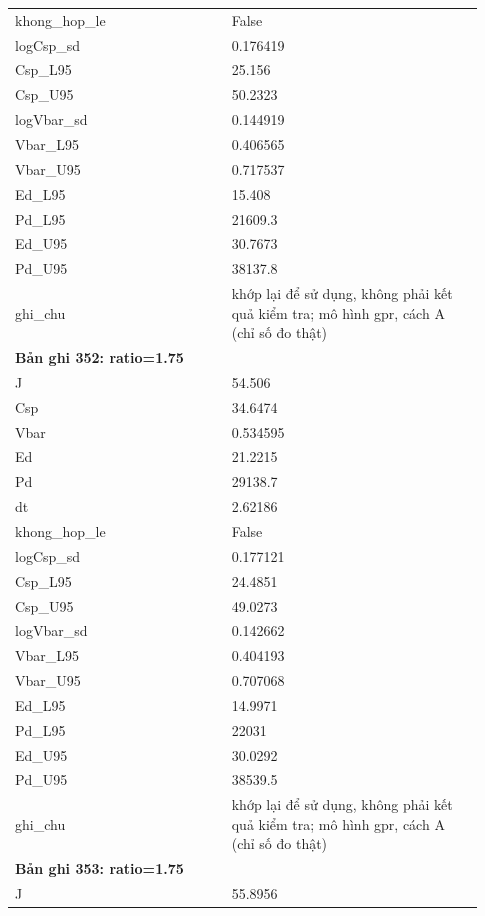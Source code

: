 \begin{longtable}{p{0.43\linewidth}p{0.50\linewidth}}
khong\_\allowbreak hop\_\allowbreak le & False \\
logCsp\_\allowbreak sd & 0.176419 \\
Csp\_\allowbreak L95 & 25.156 \\
Csp\_\allowbreak U95 & 50.2323 \\
logVbar\_\allowbreak sd & 0.144919 \\
Vbar\_\allowbreak L95 & 0.406565 \\
Vbar\_\allowbreak U95 & 0.717537 \\
Ed\_\allowbreak L95 & 15.408 \\
Pd\_\allowbreak L95 & 21609.3 \\
Ed\_\allowbreak U95 & 30.7673 \\
Pd\_\allowbreak U95 & 38137.8 \\
ghi\_\allowbreak chu & khớp lại để sử dụng, không phải kết quả kiểm tra; mô hình gpr, cách A (chỉ số đo thật) \\
\midrule
\multicolumn{2}{p{0.95\linewidth}}{\textbf{Bản ghi 352: ratio=1.75}} \\
J & 54.506 \\
Csp & 34.6474 \\
Vbar & 0.534595 \\
Ed & 21.2215 \\
Pd & 29138.7 \\
dt & 2.62186 \\
khong\_\allowbreak hop\_\allowbreak le & False \\
logCsp\_\allowbreak sd & 0.177121 \\
Csp\_\allowbreak L95 & 24.4851 \\
Csp\_\allowbreak U95 & 49.0273 \\
logVbar\_\allowbreak sd & 0.142662 \\
Vbar\_\allowbreak L95 & 0.404193 \\
Vbar\_\allowbreak U95 & 0.707068 \\
Ed\_\allowbreak L95 & 14.9971 \\
Pd\_\allowbreak L95 & 22031 \\
Ed\_\allowbreak U95 & 30.0292 \\
Pd\_\allowbreak U95 & 38539.5 \\
ghi\_\allowbreak chu & khớp lại để sử dụng, không phải kết quả kiểm tra; mô hình gpr, cách A (chỉ số đo thật) \\
\midrule
\multicolumn{2}{p{0.95\linewidth}}{\textbf{Bản ghi 353: ratio=1.75}} \\
J & 55.8956 \\

\end{longtable}
